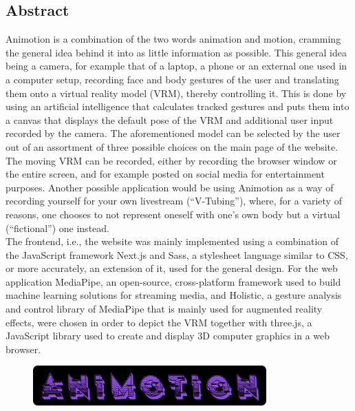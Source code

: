 \begin{spacing}{1}
    \chapter*{Abstract}
\end{spacing}
Animotion is a combination of the two words animation and motion, cramming the general idea behind it into as little information as possible. This general idea being a camera, for example that of a laptop, a phone or an external one used in a computer setup, recording face and body gestures of the user and translating them onto a virtual reality model (VRM), thereby controlling it. This is done by using an artificial intelligence that calculates tracked gestures and puts them into a canvas that displays the default pose of the VRM and additional user input recorded by the camera. The aforementioned model can be selected by the user out of an assortment of three possible choices on the main page of the website. The moving VRM can be recorded, either by recording the browser window or the entire screen, and for example posted on social media for entertainment purposes. Another possible application would be using Animotion as a way of recording yourself for your own livestream (“V-Tubing”), where, for a variety of reasons, one chooses to not represent oneself with one’s own body but a virtual (“fictional”) one instead.
\\
The frontend, i.e., the website was mainly implemented using a combination of the JavaScript framework Next.js and Sass, a stylesheet language similar to CSS, or more accurately, an extension of it, used for the general design. For the web application MediaPipe, an open-source, cross-platform framework used to build machine learning solutions for streaming media, and Holistic, a gesture analysis and control library of MediaPipe that is mainly used for augmented reality effects, were chosen in order to depict the VRM together with three.js, a JavaScript library used to create and display 3D computer graphics in a web browser.
\\
\begin{figure}[htb]
    \centering
    \includegraphics[width=0.8\textwidth]{pics/animotionlogo.png}
\end{figure}

